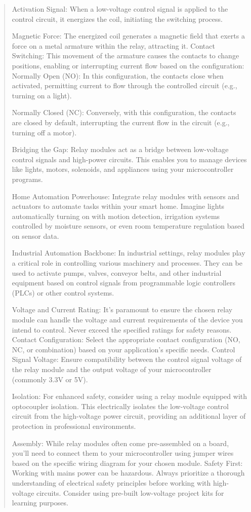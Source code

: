 \documentclass[12pt]{report}
\begin{document}
\begin{quote}
				Activation Signal: When a low-voltage control signal is applied to the control circuit, it energizes the coil, initiating the switching process.
				
				Magnetic Force: The energized coil generates a magnetic field that exerts a force on a metal armature within the relay, attracting it.
				Contact Switching: This movement of the armature causes the contacts to change positions, enabling or interrupting current flow based on the configuration:
				Normally Open (NO): In this configuration, the contacts close when activated, permitting current to flow through the controlled circuit (e.g., turning on a light).
				
				Normally Closed (NC): Conversely, with this configuration, the contacts are closed by default, interrupting the current flow in the circuit (e.g., turning off a motor).
	
				Bridging the Gap: Relay modules act as a bridge between low-voltage control signals and high-power circuits. This enables you to manage devices like lights, motors, solenoids, and appliances using your microcontroller programs.
				
				Home Automation Powerhouse: Integrate relay modules with sensors and actuators to automate tasks within your smart home. Imagine lights automatically turning on with motion detection, irrigation systems controlled by moisture sensors, or even room temperature regulation based on sensor data.
				
				Industrial Automation Backbone: In industrial settings, relay modules play a critical role in controlling various machinery and processes. They can be used to activate pumps, valves, conveyor belts, and other industrial equipment based on control signals from programmable logic controllers (PLCs) or other control systems.
				
				Voltage and Current Rating: It's paramount to ensure the chosen relay module can handle the voltage and current requirements of the device you intend to control. Never exceed the specified ratings for safety reasons.
				Contact Configuration: Select the appropriate contact configuration (NO, NC, or combination) based on your application's specific needs.
				Control Signal Voltage: Ensure compatibility between the control signal voltage of the relay module and the output voltage of your microcontroller (commonly 3.3V or 5V).
				
				Isolation: For enhanced safety, consider using a relay module equipped with optocoupler isolation. This electrically isolates the low-voltage control circuit from the high-voltage power circuit, providing an additional layer of protection in professional environments.
				
				Assembly: While relay modules often come pre-assembled on a board, you'll need to connect them to your microcontroller using jumper wires based on the specific wiring diagram for your chosen module.
				Safety First:  Working with mains power can be hazardous. Always prioritize a thorough understanding of electrical safety principles before working with high-voltage circuits. Consider using pre-built low-voltage project kits for learning purposes.
				\end{quote}
				\clearpage
				
\end{document}
